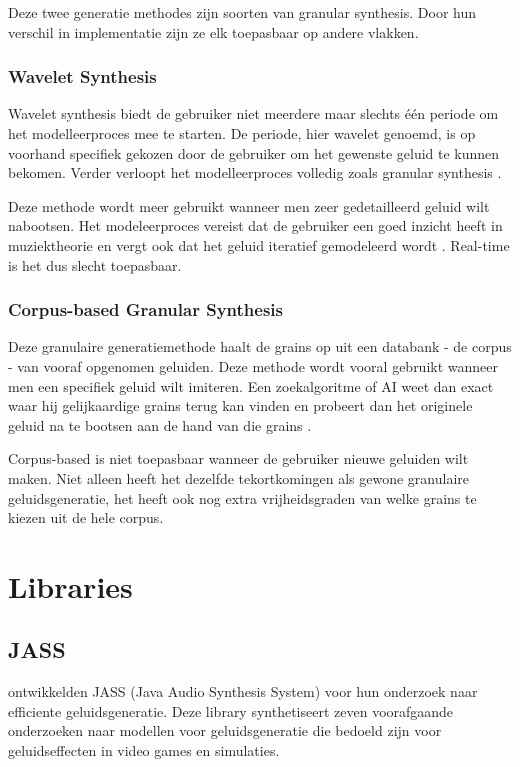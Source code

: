 Deze twee generatie methodes zijn soorten van granular synthesis. Door hun verschil in implementatie zijn ze elk toepasbaar op andere vlakken.

\subsubsection{Wavelet Synthesis}

Wavelet synthesis biedt de gebruiker niet meerdere maar slechts één periode om het modelleerproces mee te starten. De periode, hier wavelet genoemd, is op voorhand specifiek gekozen door de gebruiker om het gewenste geluid te kunnen bekomen. Verder verloopt het modelleerproces volledig zoals granular synthesis \autocite{wavelet}.

Deze methode wordt meer gebruikt wanneer men zeer gedetailleerd geluid wilt nabootsen. Het modeleerproces vereist dat de gebruiker een goed inzicht heeft in muziektheorie en vergt ook dat het geluid iteratief gemodeleerd wordt 
\autocite{wavelet}. Real-time is het dus slecht toepasbaar.

\subsubsection{Corpus-based Granular Synthesis}

Deze granulaire generatiemethode haalt de grains op uit een databank - de corpus - van vooraf opgenomen geluiden. Deze methode wordt vooral gebruikt wanneer men een specifiek geluid wilt imiteren. Een zoekalgoritme of AI weet dan exact waar hij gelijkaardige grains terug kan vinden en probeert dan het originele geluid na te bootsen aan de hand van die grains 
\autocite{methodes}.

Corpus-based is niet toepasbaar wanneer de gebruiker nieuwe geluiden wilt maken. Niet alleen heeft het dezelfde tekortkomingen als gewone granulaire geluidsgeneratie, het heeft ook nog extra vrijheidsgraden van welke grains te kiezen uit de hele corpus.

\section{Libraries}

\subsection{JASS}

\textcite{jass} ontwikkelden JASS (Java Audio Synthesis System) voor hun onderzoek naar efficiente geluidsgeneratie. Deze library synthetiseert zeven voorafgaande onderzoeken naar modellen voor geluidsgeneratie die bedoeld zijn voor geluidseffecten in video games en simulaties. 

